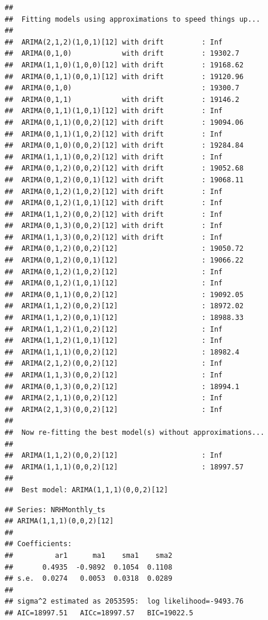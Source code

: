 \documentclass[12pt,]{article}
\begin{document}
\begin{verbatim}
## 
##  Fitting models using approximations to speed things up...
## 
##  ARIMA(2,1,2)(1,0,1)[12] with drift         : Inf
##  ARIMA(0,1,0)            with drift         : 19302.7
##  ARIMA(1,1,0)(1,0,0)[12] with drift         : 19168.62
##  ARIMA(0,1,1)(0,0,1)[12] with drift         : 19120.96
##  ARIMA(0,1,0)                               : 19300.7
##  ARIMA(0,1,1)            with drift         : 19146.2
##  ARIMA(0,1,1)(1,0,1)[12] with drift         : Inf
##  ARIMA(0,1,1)(0,0,2)[12] with drift         : 19094.06
##  ARIMA(0,1,1)(1,0,2)[12] with drift         : Inf
##  ARIMA(0,1,0)(0,0,2)[12] with drift         : 19284.84
##  ARIMA(1,1,1)(0,0,2)[12] with drift         : Inf
##  ARIMA(0,1,2)(0,0,2)[12] with drift         : 19052.68
##  ARIMA(0,1,2)(0,0,1)[12] with drift         : 19068.11
##  ARIMA(0,1,2)(1,0,2)[12] with drift         : Inf
##  ARIMA(0,1,2)(1,0,1)[12] with drift         : Inf
##  ARIMA(1,1,2)(0,0,2)[12] with drift         : Inf
##  ARIMA(0,1,3)(0,0,2)[12] with drift         : Inf
##  ARIMA(1,1,3)(0,0,2)[12] with drift         : Inf
##  ARIMA(0,1,2)(0,0,2)[12]                    : 19050.72
##  ARIMA(0,1,2)(0,0,1)[12]                    : 19066.22
##  ARIMA(0,1,2)(1,0,2)[12]                    : Inf
##  ARIMA(0,1,2)(1,0,1)[12]                    : Inf
##  ARIMA(0,1,1)(0,0,2)[12]                    : 19092.05
##  ARIMA(1,1,2)(0,0,2)[12]                    : 18972.02
##  ARIMA(1,1,2)(0,0,1)[12]                    : 18988.33
##  ARIMA(1,1,2)(1,0,2)[12]                    : Inf
##  ARIMA(1,1,2)(1,0,1)[12]                    : Inf
##  ARIMA(1,1,1)(0,0,2)[12]                    : 18982.4
##  ARIMA(2,1,2)(0,0,2)[12]                    : Inf
##  ARIMA(1,1,3)(0,0,2)[12]                    : Inf
##  ARIMA(0,1,3)(0,0,2)[12]                    : 18994.1
##  ARIMA(2,1,1)(0,0,2)[12]                    : Inf
##  ARIMA(2,1,3)(0,0,2)[12]                    : Inf
## 
##  Now re-fitting the best model(s) without approximations...
## 
##  ARIMA(1,1,2)(0,0,2)[12]                    : Inf
##  ARIMA(1,1,1)(0,0,2)[12]                    : 18997.57
## 
##  Best model: ARIMA(1,1,1)(0,0,2)[12]
\end{verbatim}

\begin{verbatim}
## Series: NRHMonthly_ts 
## ARIMA(1,1,1)(0,0,2)[12] 
## 
## Coefficients:
##          ar1      ma1    sma1    sma2
##       0.4935  -0.9892  0.1054  0.1108
## s.e.  0.0274   0.0053  0.0318  0.0289
## 
## sigma^2 estimated as 2053595:  log likelihood=-9493.76
## AIC=18997.51   AICc=18997.57   BIC=19022.5
\end{verbatim}
\end{document}
